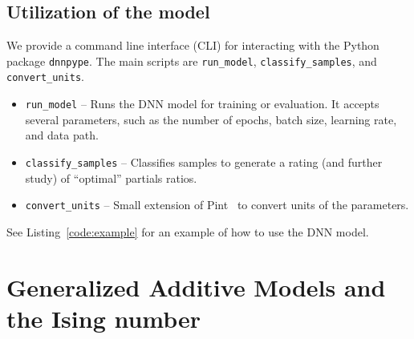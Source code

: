 \documentclass{psu-report}
\begin{document}
\section{Utilization of the model}

We provide a command line interface (CLI) for interacting with the Python
package \texttt{dnnpype}.
The main scripts are \texttt{run\_model}, \texttt{classify\_samples}, and
\texttt{convert\_units}.
\begin{itemize}
    \item \texttt{run\_model} -- Runs the DNN model for training or evaluation.
        It accepts several parameters, such as the number of epochs, batch size,
        learning rate, and data path.
    \item \texttt{classify\_samples} -- Classifies samples to generate a rating
        (and further study) of ``optimal'' partials ratios.
    \item \texttt{convert\_units} -- Small extension of Pint~\autocite{2025Pint-1}
        to convert units of the parameters.
\end{itemize}
See Listing~\autoref{code:example} for an example of how to use the DNN model.




\chapter{Generalized Additive Models and the Ising number}


\nocite{*} %
\printchicagobibliography


\end{document}
